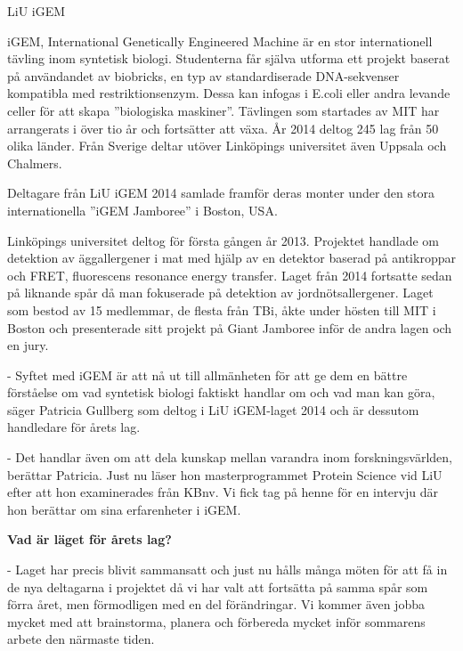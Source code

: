 \begin{news}{3}{LiU iGEM}{}{}{}{}

  iGEM, International Genetically Engineered Machine är en stor
  internationell tävling inom syntetisk biologi. Studenterna får
  själva utforma ett projekt baserat på användandet av biobricks, en
  typ av standardiserade DNA-sekvenser kompatibla med
  restriktionsenzym. Dessa kan infogas i E.coli eller andra levande
  celler för att skapa ”biologiska maskiner”. Tävlingen som startades
  av MIT har arrangerats i över tio år och fortsätter att växa. År
  2014 deltog 245 lag från 50 olika länder. Från Sverige deltar utöver
  Linköpings universitet även Uppsala och Chalmers.

     {Deltagare från LiU iGEM 2014 samlade
     framför deras monter under den stora internationella ”iGEM
     Jamboree” i Boston, USA.}

  Linköpings universitet deltog för första gången år 2013. Projektet
  handlade om detektion av äggallergener i mat med hjälp av en
  detektor baserad på antikroppar och FRET, fluorescens resonance
  energy transfer. Laget från 2014 fortsatte sedan på liknande spår då
  man fokuserade på detektion av jordnötsallergener. Laget som bestod
  av 15 medlemmar, de flesta från TBi, åkte under hösten till MIT i Boston
  och presenterade sitt projekt på Giant Jamboree inför de andra lagen och en
  jury.

  - Syftet med iGEM är att nå ut till allmänheten för att ge dem en
  bättre förståelse om vad syntetisk biologi faktiskt handlar om och
  vad man kan göra, säger Patricia Gullberg som deltog i LiU
  iGEM-laget 2014 och är dessutom handledare för årets lag.

  - Det handlar även om att dela kunskap mellan varandra inom
  forskningsvärlden, berättar Patricia. Just nu läser hon
  masterprogrammet Protein Science vid LiU efter att hon examinerades
  från KBnv. Vi fick tag på henne för en intervju där hon berättar om
  sina erfarenheter i iGEM.


  \textbf{Vad är läget för årets lag?}

  - Laget har precis blivit
  sammansatt och just nu hålls många möten för att få in de nya
  deltagarna i projektet då vi har valt att fortsätta på samma spår
  som förra året, men förmodligen med en del förändringar. Vi kommer
  även jobba mycket med att brainstorma, planera och förbereda mycket
  inför sommarens arbete den närmaste tiden.


\end{news}
